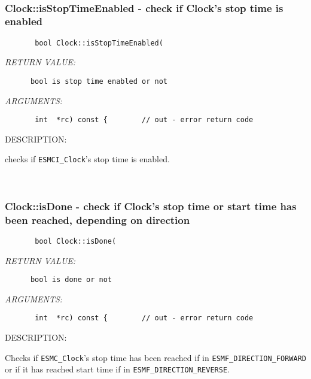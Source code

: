  
\mbox{}\hrulefill\ 
 
\subsubsection [Clock::isStopTimeEnabled] {Clock::isStopTimeEnabled - check if Clock's stop time is enabled}


  
\begin{verbatim}       bool Clock::isStopTimeEnabled(\end{verbatim}{\em RETURN VALUE:}
\begin{verbatim}      bool is stop time enabled or not\end{verbatim}{\em ARGUMENTS:}
\begin{verbatim}       int  *rc) const {        // out - error return code\end{verbatim}
{\sf DESCRIPTION:\\ }


      checks if {\tt ESMCI\_Clock}'s stop time is enabled.
   
 
\mbox{}\hrulefill\ 
 
\subsubsection [Clock::isDone] {Clock::isDone - check if Clock's stop time or start time has been reached, depending on direction}


  
\begin{verbatim}       bool Clock::isDone(\end{verbatim}{\em RETURN VALUE:}
\begin{verbatim}      bool is done or not\end{verbatim}{\em ARGUMENTS:}
\begin{verbatim}       int  *rc) const {        // out - error return code\end{verbatim}
{\sf DESCRIPTION:\\ }


      Checks if {\tt ESMC\_Clock}'s stop time has been reached if in
      {\tt ESMF\_DIRECTION\_FORWARD} or if it has reached start time if in
      {\tt ESMF\_DIRECTION\_REVERSE}.
   
